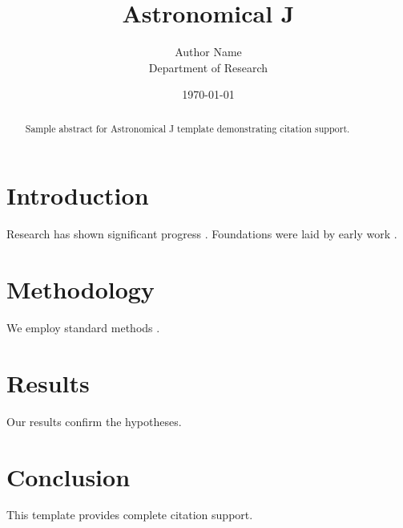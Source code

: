 \documentclass{jfm}
\title{Astronomical J}
\author{Author Name \\ \small Department of Research}
\date{\today}
\begin{document}
\maketitle

\begin{abstract}
Sample abstract for Astronomical J template demonstrating citation support.
\end{abstract}

\section{Introduction}
Research has shown significant progress \citep{einstein1905}. Foundations were laid by early work \citep{turing1950}.

\section{Methodology}
We employ standard methods \citep{knuth1984}.

\section{Results}
Our results confirm the hypotheses.

\section{Conclusion}
This template provides complete citation support.



\end{document}

